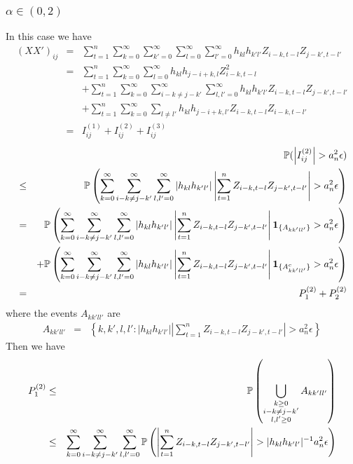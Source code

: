 \documentclass{article}
\begin{document}
\subsubsection[alpha in (0,2)]{$\alpha \in (0,2)$}
In this case we have
\begin{eqnarray*}
  (XX')_{ij} &=& \sum_{t=1}^n \sum_{k=0}^\infty \sum_{k'=0}^\infty
  \sum_{l=0}^\infty \sum_{l'=0}^\infty h_{kl} h_{k'l'} Z_{i-k,t-l}
  Z_{j-k',t-l'} \\
  &=& \sum_{t=1}^n \sum_{k=0}^\infty \sum_{l=0}^\infty h_{kl}
  h_{j-i+k,l} Z_{i-k, t-l}^2 \\
  && + \sum_{t=1}^n \sum_{k=0}^\infty \sum_{i-k \neq j-k'}^\infty
  \sum_{l,l'=0}^\infty h_{kl} h_{k'l'} Z_{i-k,t-l} Z_{j-k',t-l'} \\
  && + \sum_{t=1}^n \sum_{k=0}^\infty \sum_{l\neq l'} h_{kl}
  h_{j-i+k, l'} Z_{i-k,t-l} Z_{i-k,t-l'} \\
  &=& I^{(1)}_{ij} + I^{(2)}_{ij} + I^{(3)}_{ij}
\end{eqnarray*}
\begin{eqnarray*}
  && \mathbb{P}(\left| I^{(2)}_{ij} \right| > a_n^2 \epsilon) \\
  &\leq& \mathbb{P}\left(
    \sum_{k=0}^\infty \sum_{i-k \neq j-k'}^\infty
    \sum_{l,l'=0}^\infty | h_{kl} h_{k'l'}| \left|
      \sum_{t=1}^n  Z_{i-k,t-l} Z_{j-k',t-l'} \right| > a_n^2 \epsilon
  \right) \\
  &=& \mathbb{P}\left(
    \sum_{k=0}^\infty \sum_{i-k \neq j-k'}^\infty
    \sum_{l,l'=0}^\infty | h_{kl} h_{k'l'}| \left|
      \sum_{t=1}^n  Z_{i-k,t-l} Z_{j-k',t-l'} \right|
    \mathbf{1}_{\{A_{kk'll'}\}} > a_n^2 \epsilon
  \right) \\
  && + \mathbb{P}\left(
    \sum_{k=0}^\infty \sum_{i-k \neq j-k'}^\infty
    \sum_{l,l'=0}^\infty | h_{kl} h_{k'l'}| \left|
      \sum_{t=1}^n  Z_{i-k,t-l} Z_{j-k',t-l'} \right|
    \mathbf{1}_{\{A^c_{kk'll'}\}} > a_n^2 \epsilon
  \right) \\
  &=& P^{(2)}_1 + P^{(2)}_2
\end{eqnarray*}
where the events $A_{kk'll'}$ are
\begin{eqnarray*}
  A_{kk'll'} &=& \left\{
  k,k',l,l': | h_{kl} h_{k'l'}| \left| \sum_{t=1}^n  Z_{i-k,t-l} Z_{j-k',t-l'}
  \right| > a_n^2 \epsilon
  \right\}
\end{eqnarray*}
Then we have
\begin{eqnarray*}
  P^{(2)}_1 &\leq& \mathbb{P}\left(
    \bigcup_{\substack{k \geq 0 \\ i-k \neq j-k' \\ l,l'\geq0}}
    A_{kk'll'}
  \right) \\
  &\leq& \sum_{k=0}^\infty \sum_{i-k \neq j-k'}^\infty
  \sum_{l,l'=0}^\infty \mathbb{P}\left(
    \left| \sum_{t=1}^n  Z_{i-k,t-l} Z_{j-k',t-l'}
    \right| > | h_{kl} h_{k'l'}|^{-1} a_n^2 \epsilon 
  \right)
\end{eqnarray*}
\end{document}
